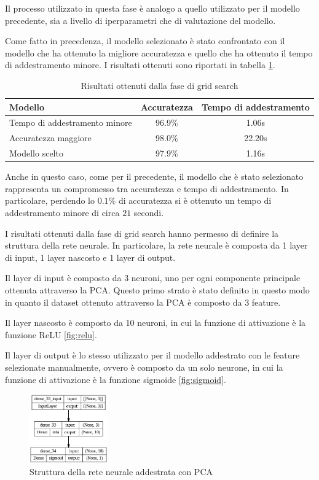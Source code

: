 Il processo utilizzato in questa fase è analogo a quello utilizzato per il modello
precedente, sia a livello di iperparametri che di valutazione del modello.

Come fatto in precedenza, il modello selezionato è stato confrontato con il modello
che ha ottenuto la migliore accuratezza e quello che ha ottenuto il tempo di
addestramento minore. I risultati ottenuti sono riportati in tabella \ref{tab:ris-grid-search-pca}.

\begin{table}[ht]
    \centering
    \begin{tabular}{@{}lcc@{}}
        \toprule
        \rowcolor[HTML]{EFEFEF}
        \textbf{Modello}              & \textbf{Accuratezza} & \textbf{Tempo di addestramento} \\ \midrule
        Tempo di addestramento minore & 96.9\%               & 1.06s                           \\
        Accuratezza maggiore          & 98.0\%               & 22.20s                          \\
        Modello scelto                & 97.9\%               & 1.16s                           \\ \bottomrule
    \end{tabular}
    \caption{Risultati ottenuti dalla fase di grid search}
    \label{tab:ris-grid-search-pca}
\end{table}
Anche in questo caso, come per il precedente, il modello che è stato selezionato
rappresenta un compromesso tra accuratezza e tempo di addestramento. In particolare,
perdendo lo $0.1\%$ di accuratezza si è ottenuto un tempo di addestramento minore
di circa $21$ secondi.


I risultati ottenuti dalla fase di grid search hanno permesso di definire la
struttura della rete neurale. In particolare, la rete neurale è composta da 1
layer di input, 1 layer nascosto e 1 layer di output.

Il layer di input è composto da 3 neuroni, uno per ogni componente principale
ottenuta attraverso la PCA. Questo primo strato è stato definito in questo modo
in quanto il dataset ottenuto attraverso la PCA è composto da 3 feature.

Il layer nascosto è composto da 10 neuroni, in cui la funzione di attivazione è
la funzione ReLU \ref{fig:relu}.

Il layer di output è lo stesso utilizzato per il modello addestrato con le feature
selezionate manualmente, ovvero è composto da un solo neurone, in cui la funzione
di attivazione è la funzione sigmoide \ref{fig:sigmoid}.
\begin{figure}[!ht]
    \centering
    \includegraphics[width=0.3\textwidth]{img/rete/struttura_rete_pca.png}
    \caption{Struttura della rete neurale addestrata con PCA}
    \label{fig:strutturaReteNeuralePCA}
\end{figure}